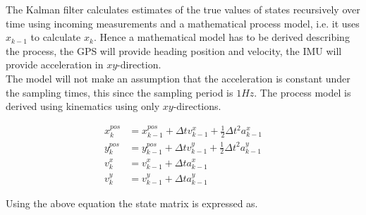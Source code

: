 The Kalman filter calculates estimates of the true values of states recursively over time using incoming measurements and a mathematical process model, i.e. it uses $x_{k-1}$ to calculate $x_k$. Hence a mathematical model has to be derived describing the process, the GPS will provide heading position and velocity, the IMU will provide acceleration in $xy$-direction.\\
The model will not make an assumption that the acceleration is constant under the sampling times, this since the sampling period is $1Hz$. The process model is derived using kinematics using only $xy$-directions.
	
\begin{align}
x^{pos}_{k}&=x^{pos}_{k-1}+\Delta tv^{x}_{k-1}+\frac{1}{2}\Delta t^2a^x_{k-1}\\
y^{pos}_{k}&=y^{pos}_{k-1}+\Delta tv^{y}_{k-1}+\frac{1}{2}\Delta t^2a^y_{k-1}\\
v^{x}_{k}&=v^{x}_{k-1}+\Delta ta^x_{k-1}\\
v^{y}_{k}&=v^{y}_{k-1}+\Delta ta^y_{k-1}
\end{align}

Using the above equation the state matrix is expressed as.

